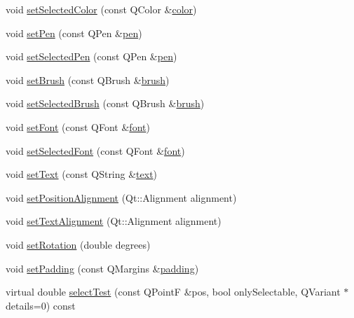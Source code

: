 \begin{DoxyCompactItemize}
\item 
void \hyperlink{classQCPItemText_ae7ba0bdb75c897b028388e45bfd435fa}{set\+Selected\+Color} (const Q\+Color \&\hyperlink{classQCPItemText_ac9cb0a8a27f64d1b40855910ea9ebd03}{color})
\item 
void \hyperlink{classQCPItemText_a9b9ec6eea0eb0603977ff84d4c78d0a3}{set\+Pen} (const Q\+Pen \&\hyperlink{classQCPItemText_a552bd02f46dbcb4b4812559036893352}{pen})
\item 
void \hyperlink{classQCPItemText_a291febe586f0da3f1c392e77bef4aa20}{set\+Selected\+Pen} (const Q\+Pen \&\hyperlink{classQCPItemText_a552bd02f46dbcb4b4812559036893352}{pen})
\item 
void \hyperlink{classQCPItemText_a1c7e131516df2ed8d941ef31240ded8e}{set\+Brush} (const Q\+Brush \&\hyperlink{classQCPItemText_a38b981dfacb703efa8e27346eebcb5a2}{brush})
\item 
void \hyperlink{classQCPItemText_a6b8377eeb2af75eb9528422671ac16cb}{set\+Selected\+Brush} (const Q\+Brush \&\hyperlink{classQCPItemText_a38b981dfacb703efa8e27346eebcb5a2}{brush})
\item 
void \hyperlink{classQCPItemText_a94ad60ebe04f5c07c35e7c2029e96b1f}{set\+Font} (const Q\+Font \&\hyperlink{classQCPItemText_ad34943fd68a9b1451d3e3234d072e418}{font})
\item 
void \hyperlink{classQCPItemText_a0be2841772f83663c4db307928b82816}{set\+Selected\+Font} (const Q\+Font \&\hyperlink{classQCPItemText_ad34943fd68a9b1451d3e3234d072e418}{font})
\item 
void \hyperlink{classQCPItemText_a3dacdda0ac88f99a05b333b977c48747}{set\+Text} (const Q\+String \&\hyperlink{classQCPItemText_a9547f7832010486abed0837e75db5330}{text})
\item 
void \hyperlink{classQCPItemText_a781cdf8c640fc6a055dcff1e675c8c7a}{set\+Position\+Alignment} (Qt\+::\+Alignment alignment)
\item 
void \hyperlink{classQCPItemText_ab5bc0684c4d1bed81949a11b34dba478}{set\+Text\+Alignment} (Qt\+::\+Alignment alignment)
\item 
void \hyperlink{classQCPItemText_a4bcc10cd97952c3f749d75824b5077f0}{set\+Rotation} (double degrees)
\item 
void \hyperlink{classQCPItemText_aeea8a3e01f135f9dd0bb08f51db66310}{set\+Padding} (const Q\+Margins \&\hyperlink{classQCPItemText_a00e0fa03822ff384bf4921c1c90322ff}{padding})
\item 
virtual double \hyperlink{classQCPItemText_a285b95bb6634c2e4f7768abb7a8bc69c}{select\+Test} (const Q\+PointF \&pos, bool only\+Selectable, Q\+Variant $\ast$details=0) const 
\end{DoxyCompactItemize}
